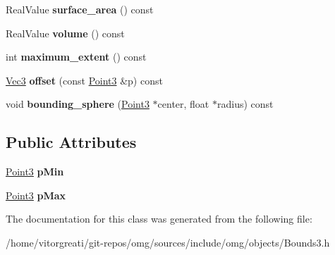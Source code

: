 \begin{DoxyCompactItemize}
Real\+Value {\bfseries surface\+\_\+area} () const
\item 
\mbox{\label{classomg_1_1_bounds3_ac5df1e7d717da90fe8bb10cbe858a892}} 
Real\+Value {\bfseries volume} () const
\item 
\mbox{\label{classomg_1_1_bounds3_a02fe90c43be415be2cd29b4d503e0ec8}} 
int {\bfseries maximum\+\_\+extent} () const
\item 
\mbox{\label{classomg_1_1_bounds3_aeef6c693085f4a8f59b1711c9341a15d}} 
\mbox{\hyperlink{namespaceomg_a45a9482677fee9933ff369b49894e316}{Vec3}} {\bfseries offset} (const \mbox{\hyperlink{namespaceomg_af85242d35fdacf829d32a6f9b95f3e35}{Point3}} \&p) const
\item 
\mbox{\label{classomg_1_1_bounds3_afc7671ef48879ef8405e1105fe2e50d6}} 
void {\bfseries bounding\+\_\+sphere} (\mbox{\hyperlink{namespaceomg_af85242d35fdacf829d32a6f9b95f3e35}{Point3}} $\ast$center, float $\ast$radius) const
\end{DoxyCompactItemize}
\subsection*{Public Attributes}
\begin{DoxyCompactItemize}
\item 
\mbox{\label{classomg_1_1_bounds3_a6ccd4b172b8daa976fb75d9864934977}} 
\mbox{\hyperlink{namespaceomg_af85242d35fdacf829d32a6f9b95f3e35}{Point3}} {\bfseries p\+Min}
\item 
\mbox{\label{classomg_1_1_bounds3_a9cda721148a1a768eeb906df14fc41b2}} 
\mbox{\hyperlink{namespaceomg_af85242d35fdacf829d32a6f9b95f3e35}{Point3}} {\bfseries p\+Max}
\end{DoxyCompactItemize}


The documentation for this class was generated from the following file\+:\begin{DoxyCompactItemize}
\item 
/home/vitorgreati/git-\/repos/omg/sources/include/omg/objects/Bounds3.\+h\end{DoxyCompactItemize}
